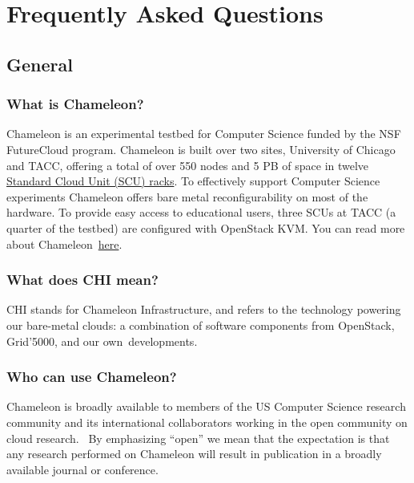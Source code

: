 \FILENAME

\chapter{Frequently Asked Questions}\label{frequently-asked-questions}

\section{General}\label{general}

\subsection{What is Chameleon?}\label{what-is-chameleon}

Chameleon is an experimental testbed for Computer Science funded by the
NSF FutureCloud program. Chameleon is built over two sites, University
of Chicago and TACC, offering a total of over 550 nodes and 5 PB of
space in twelve
\href{https://www.chameleoncloud.org/about/hardware-description/}{Standard
Cloud Unit (SCU) racks}. To effectively support Computer Science
experiments Chameleon offers bare metal reconfigurability on most of the
hardware. To provide easy access to educational users, three SCUs at
TACC (a quarter of the testbed) are configured with OpenStack KVM. You
can read more about
Chameleon~\href{https://www.chameleoncloud.org/about/chameleon/}{here}.

\subsection{What does CHI mean?}\label{what-does-chi-mean}

CHI stands for Chameleon Infrastructure, and refers to the technology
powering our bare-metal clouds: a combination of software components
from OpenStack, Grid'5000, and our own~developments.

\subsection{Who can use Chameleon?}\label{who-can-use-chameleon}

Chameleon is broadly available to members of the US Computer Science
research community and its international collaborators working in the
open community on cloud research. ~By emphasizing ``open'' we mean that
the expectation is that any research performed on Chameleon will result
in publication in a broadly available journal or conference.~

